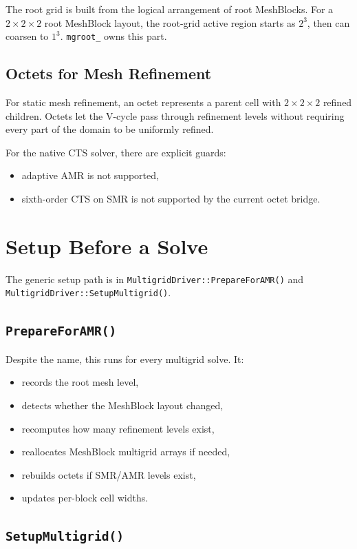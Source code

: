 \documentclass[11pt]{article}
\newcommand{\code}[1]{\texttt{#1}}
\begin{document}
The root grid is built from the logical arrangement of root MeshBlocks.  For a
\(2\times2\times2\) root MeshBlock layout, the root-grid active region starts
as \(2^3\), then can coarsen to \(1^3\).  \code{mgroot\_} owns this part.

\subsection{Octets for Mesh Refinement}

For static mesh refinement, an octet represents a parent cell with \(2\times2
\times2\) refined children.  Octets let the V-cycle pass through refinement
levels without requiring every part of the domain to be uniformly refined.

For the native CTS solver, there are explicit guards:
\begin{itemize}
  \item adaptive AMR is not supported,
  \item sixth-order CTS on SMR is not supported by the current octet bridge.
\end{itemize}

\section{Setup Before a Solve}

The generic setup path is in \code{MultigridDriver::PrepareForAMR()} and
\code{MultigridDriver::SetupMultigrid()}.

\subsection{\code{PrepareForAMR()}}

Despite the name, this runs for every multigrid solve.  It:
\begin{itemize}
  \item records the root mesh level,
  \item detects whether the MeshBlock layout changed,
  \item recomputes how many refinement levels exist,
  \item reallocates MeshBlock multigrid arrays if needed,
  \item rebuilds octets if SMR/AMR levels exist,
  \item updates per-block cell widths.
\end{itemize}

\subsection{\code{SetupMultigrid()}}
\end{document}
